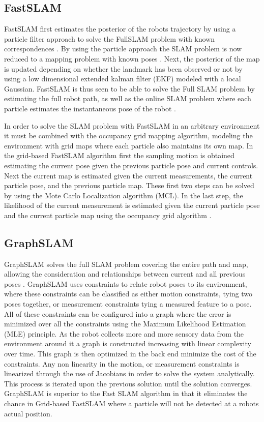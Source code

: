 \documentclass[10pt,journal,compsoc]{IEEEtran}
\begin{document}
\subsection{FastSLAM}
\label{subsec:fastslam}
FastSLAM first estimates the posterior of the robots trajectory by using a particle filter approach to solve the FullSLAM problem with known correspondences \cite{UdacityLesson17}. By using the particle approach the SLAM problem is now reduced to a mapping problem with known poses \cite{UdacityLesson17}.  Next, the posterior of the map is updated depending on whether the landmark has been observed or not by using a low dimensional extended kalman filter (EKF) modeled with a local Gaussian. FastSLAM is thus seen to be able to solve the Full SLAM problem by estimating the full robot path, as well as the online SLAM problem where each particle estimates the instantaneous pose of the robot \cite{UdacityLesson17}.

In order to solve the SLAM problem with FastSLAM in an arbitrary environment it must be combined with the occupancy grid mapping algorithm, modeling the environment with grid maps where each particle also maintains its own map. In the grid-based FastSLAM algorithm first the sampling motion is obtained estimating the current pose given the previous particle pose and current controls. Next the current map is estimated given the current measurements, the current particle pose, and the previous particle map. These first two steps can be solved by using the Mote Carlo Localization algorithm (MCL). In the last step, the likelihood of the current measurement is estimated given the current particle pose and the current particle map using the occupancy grid algorithm \cite{UdacityLesson17}.

\subsection{GraphSLAM}
\label{subsec:graphslam}
GraphSLAM solves the full SLAM problem covering the entire path and map, allowing the consideration and relationships between current and all previous poses \cite{UdacityLesson18}. GraphSLAM uses constraints to relate robot poses to its environment, where these constraints can be classified as either motion constraints, tying two poses together, or measurement constraints tying a measured feature to a pose. All of these constraints can be configured into a graph where the error is minimized over all the constraints using the Maximum Likelihood Estimation (MLE) principle. As the robot collects more and more sensory data from the environment around it a graph is constructed increasing with linear complexity over time. This graph is then optimized in the back end minimize the cost of the constraints. Any non linearity in the motion, or measurement constraints is linearized through the use of Jacobians in order to solve the system analytically. This process is iterated upon the previous solution until the solution converges. GraphSLAM is superior to the Fast SLAM algorithm in that it eliminates the chance in Grid-based FastSLAM where a particle will not be detected at a robots actual position.
\end{document}
